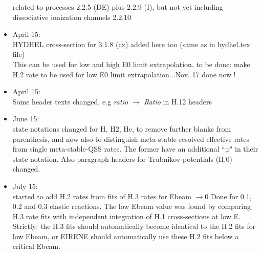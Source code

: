 \documentclass[12pt,dvipdfmx]{article}
\begin{document}
\begin{itemize}
  related to processes 2.2.5 (DE) plus 2.2.9 (I), but not yet including dissociative ionization channels 2.2.10
  \item April 15:\\
  HYDHEL cross-section for 3.1.8 (cx) added here too (same as in hydhel.tex file)\\
  This can be used for low and high E0 limit extrapolation.
  to be done: make H.2 rate to be used for low E0 limit extrapolation...Nov. 17 done now !
  \item April 15:\\
  Some header texts changed, e.g \emph{ratio} $\rightarrow$ \emph{Ratio} in H.12 headers
  \item June 15:\\
  state notations changed for H, H2, He, to remove further blanks from parenthesis, and
  now also to distinguish meta-stable-resolved effective rates from single
  meta-stable-QSS rates. The former have an additional ``;r" in their state notation.
  Also paragraph headers for Trubnikov potentials (H.0) changed.
 \item July 15:\\
 started to add H.2 rates from fits of H.3 rates for Ebeam $\rightarrow 0$
 Done for 0.1, 0.2 and 0.3 elastic reactions. The low Ebeam value was found by comparing H.3 rate fits
 with independent integration of H.1 cross-sections at low E. Strictly: the H.3 fits should
 automatically
 become identical to the H.2 fits for low Ebeam, or EIRENE should automatically use these H.2 fits below a critical Ebeam.


\end{itemize}
\end{document}
